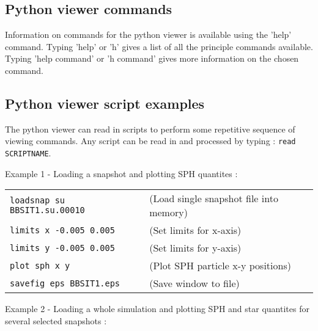 \documentclass[a4paper]{article}
\newcommand{\var}[1]{\texttt{#1}}
\begin{document}
\subsection{Python viewer commands}

Information on commands for the python viewer is available using the 'help' command.  Typing 'help' or 'h' gives a list of all the principle commands available.  Typing 'help command' or 'h command' gives more information on the chosen command.



\subsection{Python viewer script examples}

The python viewer can read in scripts to perform some repetitive sequence of viewing commands.  Any script can be read in and processed by typing : 
\var{read SCRIPTNAME}. \\
\newline

\noindent Example 1 - Loading a snapshot and plotting SPH quantites : \\

\begin{tabular}{p{7cm}p{6cm}}
\var{loadsnap su BBSIT1.su.00010} &        (Load single snapshot file into memory)\\
\var{limits x -0.005 0.005}       &        (Set limits for x-axis) \\
\var{limits y -0.005 0.005}       &        (Set limits for y-axis) \\
\var{plot sph x y}                &        (Plot SPH particle x-y positions) \\
\var{savefig eps BBSIT1.eps}      &        (Save window to file)
\end{tabular}
\newline


\noindent Example 2 - Loading a whole simulation and plotting SPH and star quantites for several selected snapshots : \\
\end{document}
